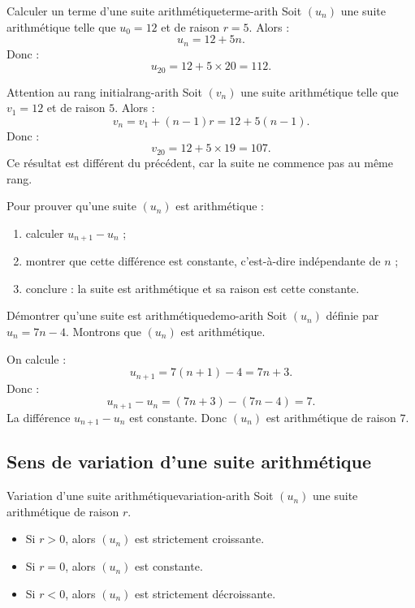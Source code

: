 \documentclass[11pt,a4paper]{article}
\begin{document}
\begin{examplebox}{Calculer un terme d'une suite arithmétique}{terme-arith}
Soit $(u_n)$ une suite arithmétique telle que $u_0=12$ et de raison $r=5$.
Alors :
\[
 u_n=12+5n.
\]
Donc :
\[
 u_{20}=12+5\times20=112.
\]
\end{examplebox}

\begin{examplebox}{Attention au rang initial}{rang-arith}
Soit $(v_n)$ une suite arithmétique telle que $v_1=12$ et de raison $5$.
Alors :
\[
 v_n=v_1+(n-1)r=12+5(n-1).
\]
Donc :
\[
 v_{20}=12+5\times19=107.
\]
Ce résultat est différent du précédent, car la suite ne commence pas au même rang.
\end{examplebox}

\begin{methodbox}
Pour prouver qu'une suite $(u_n)$ est arithmétique :
\begin{enumerate}
  \item calculer $u_{n+1}-u_n$ ;
  \item montrer que cette différence est constante, c'est-à-dire indépendante de $n$ ;
  \item conclure : la suite est arithmétique et sa raison est cette constante.
\end{enumerate}
\end{methodbox}

\begin{examplebox}{Démontrer qu'une suite est arithmétique}{demo-arith}
Soit $(u_n)$ définie par $u_n=7n-4$.
Montrons que $(u_n)$ est arithmétique.

On calcule :
\[
 u_{n+1}=7(n+1)-4=7n+3.
\]
Donc :
\[
 u_{n+1}-u_n=(7n+3)-(7n-4)=7.
\]
La différence $u_{n+1}-u_n$ est constante. Donc $(u_n)$ est arithmétique de raison $7$.
\end{examplebox}

\subsection{Sens de variation d'une suite arithmétique}

\begin{propositionbox}{Variation d'une suite arithmétique}{variation-arith}
Soit $(u_n)$ une suite arithmétique de raison $r$.
\begin{itemize}
  \item Si $r>0$, alors $(u_n)$ est strictement croissante.
  \item Si $r=0$, alors $(u_n)$ est constante.
  \item Si $r<0$, alors $(u_n)$ est strictement décroissante.
\end{itemize}
\end{propositionbox}
\end{document}
